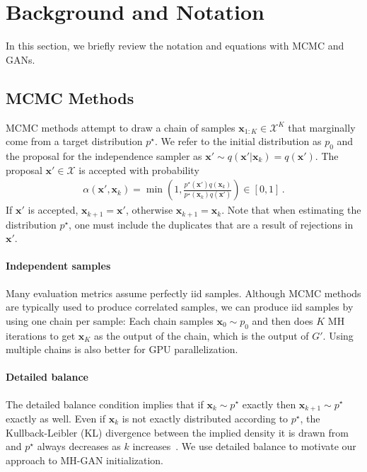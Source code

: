 \documentclass{article}
\renewcommand{\vec}[1]{{\boldsymbol{\mathbf{#1}}}} %
\newcommand{\set}[1]{\mathcal{#1}}
\newcommand{\sample}{\sim}
\newcommand{\given}{|}
\newcommand{\target}{{p^\star}}
\newcommand{\prop}{q}
\newcommand{\pinit}{{p_0}}
\newcommand{\accept}{\alpha}
\newcommand{\setx}{\set{X}}
\begin{document}
\section{Background and Notation}
\label{sec:Background}

In this section, we briefly review the notation and equations with MCMC and GANs.

\subsection{MCMC Methods}
\label{sec:MCMC Methods}

MCMC methods attempt to draw a chain of samples $\vec x_{1:K} \in \setx^K$ that marginally come from a target distribution $\target$.
We refer to the initial distribution as $\pinit$ and the proposal for the independence sampler as $\vec x' \sample \prop(\vec x' \given \vec x_k)=\prop(\vec x')$.
The proposal $\vec x' \in \setx$ is accepted with probability
\begin{align}
  \accept(\vec x', \vec x_k) = \min\left(1, \frac{\target(\vec x')\prop(\vec x_k)}{\target(\vec x_k)\prop(\vec x')}\right) \in [0,1]\,. \label{eq:alpha def}
\end{align}
If $\vec x'$ is accepted, $\vec x_{k+1} = \vec x'$, otherwise $\vec x_{k+1} = \vec x_k$.
Note that when estimating the distribution $\target$, one must include the duplicates that are a result of rejections in $\vec x'$.

\paragraph{Independent samples}
Many evaluation metrics assume perfectly iid samples.
Although MCMC methods are typically used to produce correlated samples, we can produce iid samples by using one chain per sample:
Each chain samples $\vec x_0 \sample \pinit$ and then does $K$ MH iterations to get $\vec x_K$ as the output of the chain, which is the output of $G'$.
Using multiple chains is also better for GPU parallelization.

\paragraph{Detailed balance}
The detailed balance condition implies that if $\vec x_k \sample \target$ exactly then $\vec x_{k+1} \sample \target$ exactly as well.
Even if $\vec x_k$ is not exactly distributed according to $\target$, the Kullback-Leibler (KL) divergence between the implied density it is drawn from and $\target$ always decreases as $k$ increases~\citep{Murray2008}.
We use detailed balance to motivate our approach to MH-GAN initialization.
\end{document}
